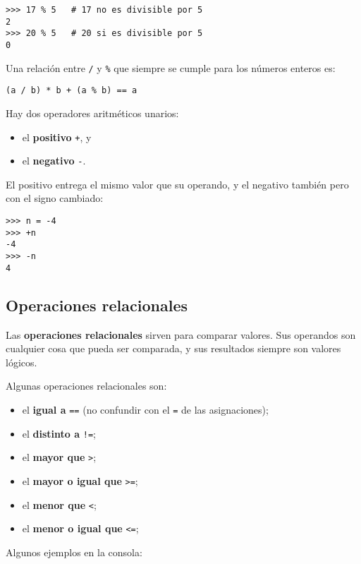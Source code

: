 \begin{lstlisting}
>>> 17 % 5   # 17 no es divisible por 5
2
>>> 20 % 5   # 20 si es divisible por 5
0
\end{lstlisting}

Una relación entre \lstinline!/! y \lstinline!%! que siempre se cumple
para los números enteros es:

\begin{lstlisting}
(a / b) * b + (a % b) == a
\end{lstlisting}

Hay dos operadores aritméticos unarios:

\begin{itemize}
\item
  el \textbf{positivo} \lstinline!+!, y
\item
  el \textbf{negativo} \lstinline!-!.
\end{itemize}

El positivo entrega el mismo valor que su operando, y el negativo
también pero con el signo cambiado:

\begin{lstlisting}
>>> n = -4
>>> +n
-4
>>> -n
4
\end{lstlisting}

\subsection{Operaciones relacionales}

Las \textbf{operaciones relacionales} sirven para comparar valores. Sus
operandos son cualquier cosa que pueda ser comparada, y sus resultados
siempre son valores lógicos.

Algunas operaciones relacionales son:

\begin{itemize}
\item
  el \textbf{igual a} \lstinline!==! (no confundir con el \lstinline!=!
  de las asignaciones);
\item
  el \textbf{distinto a} \lstinline"!=";
\item
  el \textbf{mayor que} \lstinline!>!;
\item
  el \textbf{mayor o igual que} \lstinline!>=!;
\item
  el \textbf{menor que} \lstinline!<!;
\item
  el \textbf{menor o igual que} \lstinline!<=!;
\end{itemize}

Algunos ejemplos en la consola:

